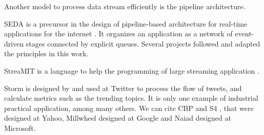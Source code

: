 Another model to process data stream efficiently is the pipeline architecture.

SEDA is a precursor in the design of pipeline-based architecture for real-time applications for the internet \cite{Welsh2001}.
It organizes an application as a network of event-driven stages connected by explicit queues.
Several projects followed and adapted the principles in this work.

StreaMIT is a language to help the programming of large streaming application \cite{Thies2002}.

Storm \cite{Toshniwal2014} is designed by and used at Twitter to process the flow of tweets, and calculate metrics such as the trending topics.
It is only one example of industrial practical application, among many others.
We can cite CBP \cite{Logothetis2010} and S4 \cite{Neumeyer2010}, that were designed at Yahoo, Millwheel \cite{Akidau2013} designed at Google and Naiad \cite{Murray2013} designed at Microsoft.


